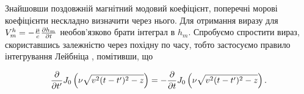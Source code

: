 Знайшовши поздовжній магнітний модовий коефіцієнт, 
поперечні морові коефіцієнти нескладно визначити через нього. 
Для отримання виразу для $ V_m^h = - \frac{\mu}{c} \frac{\partial h_m}{\partial t} $
необов'язково брати інтеграл в $ h_m $. Спробуємо спростити 
вираз, скориставшись залежністю через похідну по часу, тобто 
застосуємо правило інтегрування Лейбніца \cite{imp:Flanders1973}, 
помітивши, що

\begin{equation*} \begin{aligned}
\frac{\partial }{\partial t'} J_0 \left( \nu \sqrt{v^2 (t-t')^2 - z} \right) =
- \frac{\partial }{\partial t} J_0 \left( \nu \sqrt{v^2 (t-t')^2 - z} \right).
\end{aligned} \end{equation*}

%
%
%
